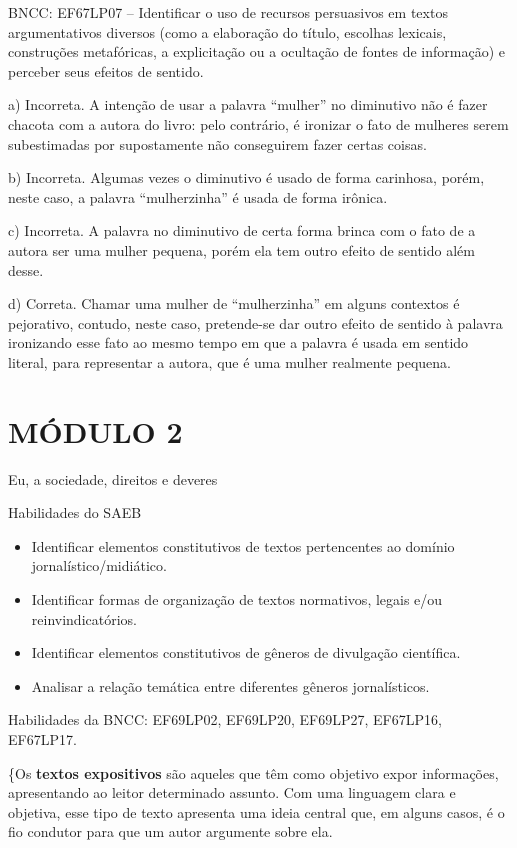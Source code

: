 BNCC: EF67LP07 -- Identificar o uso de recursos persuasivos em textos
argumentativos diversos (como a elaboração do título, escolhas lexicais,
construções metafóricas, a explicitação ou a ocultação de fontes de
informação) e perceber seus efeitos de sentido.

a) Incorreta. A intenção de usar a palavra ``mulher'' no diminutivo não
é fazer chacota com a autora do livro: pelo contrário, é ironizar o fato
de mulheres serem subestimadas por supostamente não conseguirem fazer
certas coisas.

b) Incorreta. Algumas vezes o diminutivo é usado de forma carinhosa,
porém, neste caso, a palavra ``mulherzinha'' é usada de forma irônica.

c) Incorreta. A palavra no diminutivo de certa forma brinca com o fato
de a autora ser uma mulher pequena, porém ela tem outro efeito de
sentido além desse.

d) Correta. Chamar uma mulher de ``mulherzinha'' em alguns contextos é
pejorativo, contudo, neste caso, pretende-se dar outro efeito de sentido
à palavra ironizando esse fato ao mesmo tempo em que a palavra é usada
em sentido literal, para representar a autora, que é uma mulher
realmente pequena.

\hypertarget{muxf3dulo-2}{%
\section{MÓDULO 2}\label{muxf3dulo-2}}

Eu, a sociedade, direitos e deveres

Habilidades do SAEB

\begin{itemize}
\tightlist
\item
  Identificar elementos constitutivos de textos pertencentes ao domínio
  jornalístico/midiático.
\item
  Identificar formas de organização de textos normativos, legais e/ou
  reinvindicatórios.
\item
  Identificar elementos constitutivos de gêneros de divulgação
  científica.
\item
  Analisar a relação temática entre diferentes gêneros jornalísticos.
\end{itemize}

Habilidades da BNCC: EF69LP02, EF69LP20, EF69LP27, EF67LP16, EF67LP17.

\conteudo

\{Os \textbf{textos expositivos} são aqueles que têm como objetivo expor
informações, apresentando ao leitor determinado assunto. Com uma
linguagem clara e objetiva, esse tipo de texto apresenta uma ideia
central que, em alguns casos, é o fio condutor para que um autor
argumente sobre ela.

